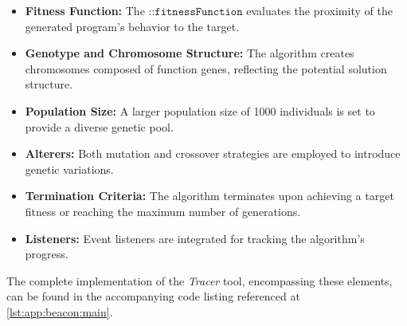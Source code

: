         \begin{itemize}
            \item \textbf{Fitness Function:} The \(\texttt{::fitnessFunction}\) evaluates the proximity of the generated 
                program's behavior to the target.
            \item \textbf{Genotype and Chromosome Structure:} The algorithm creates chromosomes composed of function
                genes, reflecting the potential solution structure.
            \item \textbf{Population Size:} A larger population size of 1000 individuals is set to provide a diverse
                genetic pool.
            \item \textbf{Alterers:} Both mutation and crossover strategies are employed to introduce genetic 
                variations.
            \item \textbf{Termination Criteria:} The algorithm terminates upon achieving a target fitness or reaching
                the maximum number of generations.
            \item \textbf{Listeners:} Event listeners are integrated for tracking the algorithm's progress.
        \end{itemize}
    
        The complete implementation of the \textit{Tracer} tool, encompassing these elements, can be found in the 
        accompanying code listing referenced at \vref{lst:app:beacon:main}.
    